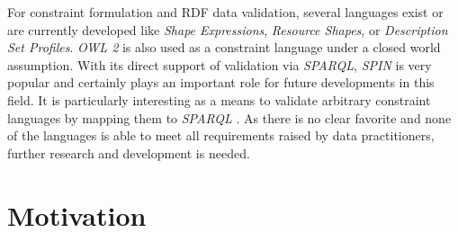 \documentclass{acm_proc_article-sp}
\begin{document}
For constraint formulation and RDF data validation, several languages exist or are currently developed like \emph{Shape Expressions}, \emph{Resource Shapes}, or \emph{Description Set Profiles}. \emph{OWL 2} is also used as a constraint language under a closed world assumption. With its direct support of validation via \emph{SPARQL}, \emph{SPIN} is very popular and certainly plays an important role for future developments in this field. It is particularly interesting as a means to validate arbitrary constraint languages by mapping them to \emph{SPARQL} \cite{BoschEckert2014-2}. 
As there is no clear favorite and none of the languages is able to meet all requirements raised by data practitioners,
further research and development is needed.

\section{Motivation}
\label{motivation}
\end{document}
